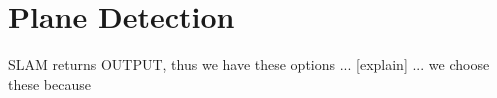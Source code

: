 \documentclass[main.tex]{subfiles}
\begin{document}
\section[Plane Detection]{Plane Detection}
SLAM returns OUTPUT, thus we have these options ... [explain] ... we choose these because
\end{document}
